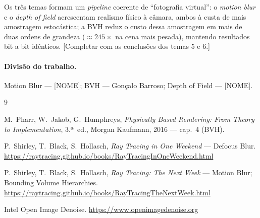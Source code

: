 \documentclass[11pt,a4paper]{article}
\begin{document}

Os três temas formam um \emph{pipeline} coerente de ``fotografia virtual'': o \emph{motion blur} e o \emph{depth of field} acrescentam realismo físico à câmara, ambos à custa de mais amostragem estocástica; a BVH reduz o custo dessa amostragem em mais de duas ordens de grandeza (${\approx}245\times$ na cena mais pesada), mantendo resultados bit a bit idênticos. [Completar com as conclusões dos temas 5 e 6.]

\paragraph{Divisão do trabalho.} Motion Blur --- [NOME]; BVH --- Gonçalo Barroso; Depth of Field --- [NOME].

\begin{thebibliography}{9}

M.~Pharr, W.~Jakob, G.~Humphreys,
\emph{Physically Based Rendering: From Theory to Implementation},
3.ª~ed., Morgan Kaufmann, 2016 --- cap.~4 (BVH).

P.~Shirley, T.~Black, S.~Hollasch,
\emph{Ray Tracing in One Weekend} --- Defocus Blur.
\url{https://raytracing.github.io/books/RayTracingInOneWeekend.html}

P.~Shirley, T.~Black, S.~Hollasch,
\emph{Ray Tracing: The Next Week} --- Motion Blur; Bounding Volume Hierarchies.
\url{https://raytracing.github.io/books/RayTracingTheNextWeek.html}

Intel Open Image Denoise.
\url{https://www.openimagedenoise.org}

\end{thebibliography}
\end{document}
